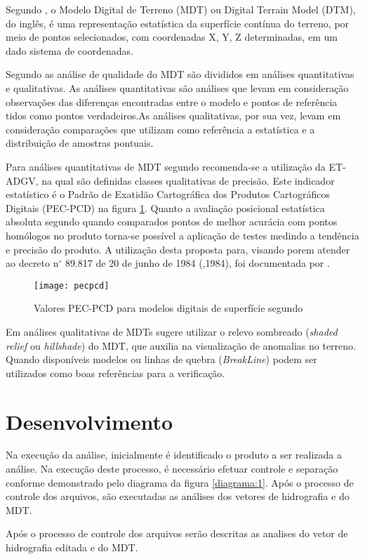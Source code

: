 \documentclass[12pt,a4paper]{article}
\begin{document}
	    Segundo , o Modelo Digital
	    	de Terreno (MDT) ou Digital Terrain Model (DTM), do inglês, é uma representação estatística
	    	da superfície contínua do terreno, por meio de pontos selecionados, com coordenadas X, Y, Z
	    	determinadas, em um dado sistema de coordenadas.
		
		Segundo  as análise de qualidade do MDT são divididos em análises quantitativas e qualitativas. As análises quantitativas são análises que levam em consideração observações das diferenças encontradas entre o modelo e pontos de referência tidos como pontos verdadeiros.As análises qualitativas, por sua vez, levam em consideração comparações que utilizam
		como referência a estatística e a distribuição de amostras pontuais.
		
		Para análises quantitativas de MDT segundo  recomenda-se a utilização da ET-ADGV,
		na qual são definidas classes qualitativas de precisão. Este indicador estatístico é o Padrão de
		Exatidão Cartográfica dos Produtos Cartográficos Digitais (PEC-PCD) na figura \ref{fig:Figura1006}. Quanto a avaliação posicional estatística absoluta segundo  quando comparados pontos de melhor acurácia com pontos homólogos no produto torna-se possível a aplicação de testes medindo a tendência e precisão do produto. A utilização desta proposta para, visando porem atender ao decreto n$^{\circ}$ 89.817 de 20 de junho de 1984 (\citeauthor{brasil22decreto},1984), foi documentada por .
		
		\begin{figure}[ht]
			\centering
			\texttt{[image: pecpcd]}
			\caption{Valores PEC-PCD para modelos digitais de superfície segundo \cite{de2011especificaccao}}
			\label{fig:Figura1006}
		\end{figure}
		Em análises qualitativas de MDTs  sugere
		utilizar o relevo sombreado (\textit{shaded relief} ou \textit{hillshade}) do MDT, que auxilia na visualização de anomalias no terreno. Quando disponíveis modelos ou
		linhas de quebra (\textit{BreakLine}) podem ser utilizados como boas referências para a verificação.

	    \section{Desenvolvimento}
		Na execução da análise, inicialmente é identificado o produto a ser realizada a análise. Na
		execução deste processo, é necessário efetuar controle e separação conforme demonstrado pelo
		diagrama da figura \ref{diagrama:1}. Após o processo de controle dos arquivos, são executadas as análises dos
		vetores de hidrografia e do MDT.
		
		Após o processo de controle dos arquivos serão descritas as analises do vetor de hidrografia editada e do MDT.
\end{document}
